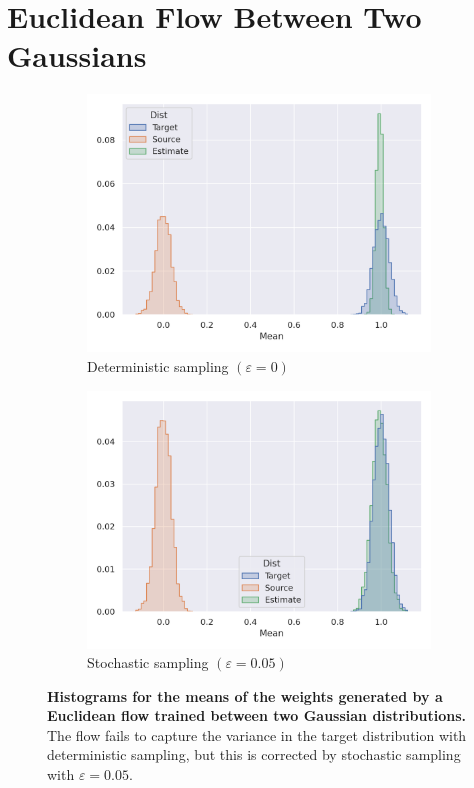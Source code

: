 \section{Euclidean Flow Between Two Gaussians} \label{sec:gaussian_flow}

\begin{figure}[h!]
    \centering
    \begin{subfigure}{0.47\linewidth}
        \centering
        \includegraphics[width=\linewidth]{figures/gaussian/0.png}
        \caption{Deterministic sampling $(\varepsilon = 0)$}
        \label{fig:gaussian_deterministic}
    \end{subfigure}
    \begin{subfigure}{0.47\linewidth}
        \centering
        \includegraphics[width=\linewidth]{figures/gaussian/0.05.png}
        \caption{Stochastic sampling $(\varepsilon = 0.05)$}
        \label{fig:gaussian_stochastic}
    \end{subfigure}
    \caption{\label{fig:gaussian-results}\textbf{Histograms for the means of the weights generated by a Euclidean flow trained between two Gaussian distributions.} The flow fails to capture the variance in the target distribution with deterministic sampling, but this is corrected by stochastic sampling with $\varepsilon = 0.05$.} 
\end{figure}

